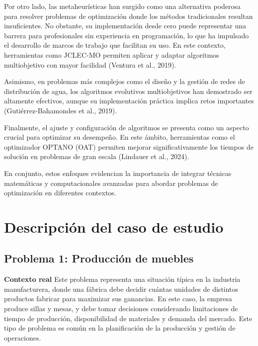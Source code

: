 \documentclass[12pt,a4paper]{article}
\begin{document}
Por otro lado, las metaheurísticas han surgido como una alternativa poderosa para resolver problemas de optimización donde los métodos tradicionales resultan insuficientes. No obstante, su implementación desde cero puede representar una barrera para profesionales sin experiencia en programación, lo que ha impulsado el desarrollo de marcos de trabajo que facilitan su uso. En este contexto, herramientas como JCLEC-MO permiten aplicar y adaptar algoritmos multiobjetivo con mayor facilidad (Ventura et al., 2019).

Asimismo, en problemas más complejos como el diseño y la gestión de redes de distribución de agua, los algoritmos evolutivos multiobjetivos han demostrado ser altamente efectivos, aunque su implementación práctica implica retos importantes (Gutiérrez-Bahamondes et al., 2019).

Finalmente, el ajuste y configuración de algoritmos se presenta como un aspecto crucial para optimizar su desempeño. En este ámbito, herramientas como el optimizador OPTANO (OAT) permiten mejorar significativamente los tiempos de solución en problemas de gran escala (Lindauer et al., 2024).

En conjunto, estos enfoques evidencian la importancia de integrar técnicas matemáticas y computacionales avanzadas para abordar problemas de optimización en diferentes contextos.

\section{Descripción del caso de estudio}

\subsection{Problema 1: Producción de muebles}

\textbf{Contexto real} Este problema representa una situación típica en la industria manufacturera, donde una fábrica debe decidir cuántas unidades de distintos productos fabricar para maximizar sus ganancias. En este caso, la empresa produce sillas y mesas, y debe tomar decisiones considerando limitaciones de tiempo de producción, disponibilidad de materiales y demanda del mercado. Este tipo de problema es común en la planificación de la producción y gestión de operaciones.
\end{document}
